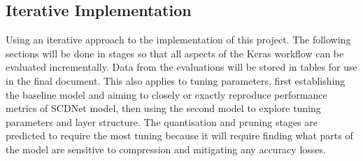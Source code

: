 \documentclass[12pt,nonacm,acmlarge,titlepage,screen]{acmart}
\begin{document}
	\subsection{Iterative Implementation}
	Using an iterative approach to the implementation of this project. The following sections will be done in stages so that all aspects of the Keras workflow can be evaluated incrementally. Data from the evaluations will be stored in tables for use in the final document. This also applies to tuning parameters, first establishing the baseline model and aiming to closely or exactly reproduce performance metrics of SCDNet model, then using the second model to explore tuning parameters and layer structure. The quantisation and pruning stages are predicted to require the most tuning because it will require finding what parts of the model are sensitive to compression and mitigating any accuracy losses.
	

\end{document}
